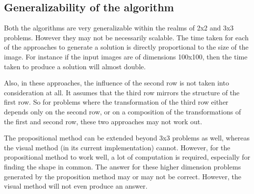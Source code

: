 \documentclass[10pt, letter]{article}
\begin{document}
\subsection*{Generalizability of the algorithm}
Both the algorithms are very generalizable within the realms of 2x2 and 3x3 problems. However they may not be necessarily scalable. The time taken for each of the approaches to generate a solution is directly proportional to the size of the image. For instance if the input images are of dimensions 100x100, then the time taken to produce a solution will almost double. 

Also, in these approaches, the influence of the second row is not taken into consideration at all. It assumes that the third row mirrors the structure of the first row. So for problems where the transformation of the third row either depends only on the second row, or on a composition of the transformations of the first and second row, these two approaches may not work out.

The propositional method can be extended beyond 3x3 problems as well, whereas the visual method (in its current implementation) cannot. However, for the propositional method to work well, a lot of computation is required, especially for finding the shape in common. The answer for these higher dimension problems generated by the proposition method may or may not be correct. However, the visual method will not even produce an answer.
\end{document}
